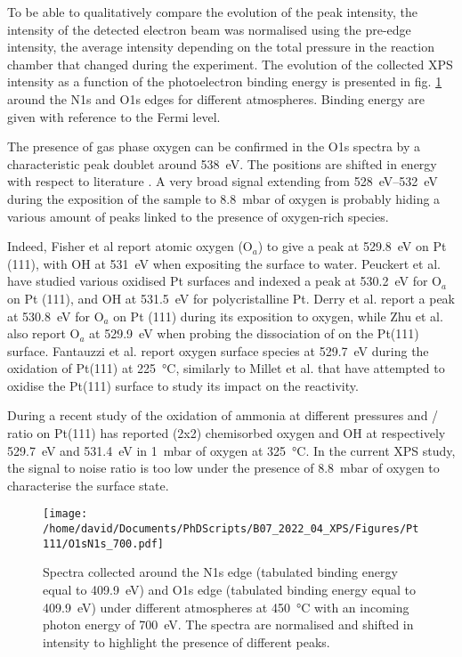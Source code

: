 To be able to qualitatively compare the evolution of the peak intensity, the intensity of the detected electron beam was normalised using the pre-edge intensity, the average intensity depending on the total pressure in the reaction chamber \parencite{Willmott} that changed during the experiment.
The evolution of the collected XPS intensity as a function of the photoelectron binding energy is presented in fig. \ref{fig:O1sN1sPt111} around the N1s and O1s edges for different atmospheres.
Binding energy are given with reference to the Fermi level.

The presence of gas phase oxygen can be confirmed in the O1s spectra by a characteristic peak doublet around \qty{538}{\eV}.
The positions are shifted in energy with respect to literature \parencite{Avval2022}.
A very broad signal extending from \qtyrange{528}{532}{\eV} during the exposition of the sample to \qty{8.8}{\milli\bar} of oxygen is probably hiding a various amount of peaks linked to the presence of oxygen-rich species.

Indeed, Fisher et al \parencite*{Fisher1980} report atomic oxygen (O$_a$) to give a peak at \qty{529.8}{\eV} on Pt (111), with OH at \qty{531}{\eV} when expositing the surface to water.
Peuckert et al. \parencite*{Peuckert1984} have studied various oxidised Pt surfaces and indexed a peak at \qty{530.2}{\eV} for O$_a$ on Pt (111), and OH at \qty{531.5}{\eV} for polycristalline Pt.
Derry et al. \parencite*{Derry1984} report a peak at \qty{530.8}{\eV} for O$_a$ on Pt (111) during its exposition to oxygen, while Zhu et al. \parencite{Zhu2003} also report O$_a$  at \qty{529.9}{\eV} when probing the dissociation of  on the Pt(111) surface.
Fantauzzi et al. report oxygen surface species at \qty{529.7}{\eV} during the oxidation of Pt(111) at \qty{225}{\degreeCelsius}, similarly to Millet et al. \parencite{Miller2014} that have attempted to oxidise the Pt(111) surface to study its impact on the reactivity.

During a recent study of the oxidation of ammonia at different pressures and / ratio on Pt(111) has reported (2x2) chemisorbed oxygen and OH at respectively \qty{529.7}{\eV} and \qty{531.4}{\eV} in \qty{1}{\milli\bar} of oxygen at \qty{325}{\degreeCelsius}.
In the current XPS study, the signal to noise ratio is too low under the presence of \qty{8.8}{\milli\bar} of oxygen to characterise the surface state.

\begin{figure}[!htb]
    \centering
    \texttt{[image: /home/david/Documents/PhDScripts/B07\_2022\_04\_XPS/Figures/Pt111/O1sN1s\_700.pdf]}
    \caption{
        Spectra collected around the N1s edge (tabulated binding energy equal to \qty{409.9}{\eV}) and O1s edge (tabulated binding energy equal to \qty{409.9}{\eV}) under different atmospheres at \qty{450}{\degreeCelsius} with an incoming photon energy of \qty{700}{\eV}.
        The spectra are normalised and shifted in intensity to highlight the presence of different peaks.
    }
    \label{fig:O1sN1sPt111}
\end{figure}

